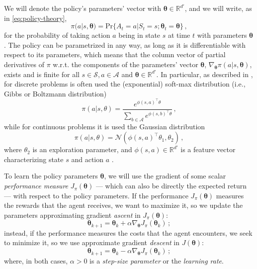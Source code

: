 We will denote the policy's parameters' vector with $\boldsymbol \theta \in \mathbb R^{d'}$, and we will write, as in \eqref{eq:policy-theory},
\begin{equation}
    \pi(a|s,\boldsymbol \theta) = \text{Pr}\{A_t = a | S_t = s; \boldsymbol \theta_t = \boldsymbol {\theta}\} \, ,
    \label{eq:policy-with-parameters}
\end{equation}
for the probability of taking action $a$ being in state $s$ at time $t$ with parameters $\boldsymbol \theta$ \cite{SuttonBarto}. The policy can be parametrized in any way, as long as it is differentiable with respect to its parameters, which means that the column vector of partial derivatives of $\pi$ w.r.t. the components of the parameters' vector $\boldsymbol \theta$, $\nabla_{\boldsymbol \theta} \pi (a|s,\boldsymbol \theta)$, exists and is finite for all $s \in \mathcal S, a \in \mathcal A$ and $\boldsymbol \theta \in \mathbb R^{d'}$. In particular, as described in \cite{Peters2010}, for discrete problems is often used the (exponential) soft-max distribution (i.e., Gibbs or Boltzmann distribution)
\begin{equation}
    \pi(a|s, \theta) = \frac{e^{\phi(s,a)^\top \theta}}{\sum_{b \in \mathcal A} e^{\phi(s,b)^\top \theta}} \, ,
    \label{eq:pi-boltzmann}
\end{equation}
while for continuous problems it is used the Gaussian distribution
\begin{equation}
    \pi(a|s, \theta) = \mathcal N(\phi(s,a)^\top \theta_1, \theta_2) \, ,
\end{equation}
where $\theta_2$ is an exploration parameter, and $\phi(s,a) \in \mathbb R^{d'}$ is a feature vector characterizing state $s$ and action $a$ \cite{Sutton2000}.

To learn the policy parameters $\boldsymbol \theta$, we will use the  gradient of some scalar \emph{performance measure} $J_\pi(\boldsymbol \theta)$ --- which can also be directly the expected return --- with respect to the policy parameters. If the performance $J_\pi(\boldsymbol \theta)$ measures the rewards that the agent receives, we want to maximize it, so we update the parameters approximating gradient \textit{ascent} in $J_\pi(\boldsymbol \theta)$:
\begin{equation}
    \boldsymbol \theta_{k+1} = \boldsymbol \theta_k + \alpha \nabla_{\boldsymbol \theta} J_\pi(\boldsymbol \theta_k) \, ;
    \label{eq:grad-ascent}
\end{equation}
instead, if the performance measures the costs that the agent encounters, we seek to minimize it, so we use approximate gradient \textit{descent} in $J(\boldsymbol \theta)$:
\begin{equation}
    \boldsymbol \theta_{k+1} = \boldsymbol \theta_k - \alpha \nabla_{\boldsymbol \theta} J_\pi(\boldsymbol \theta_k) \, ;
    \label{eq:grad-descent}
\end{equation}
where, in both cases, $\alpha > 0$ is a \emph{step-size parameter} or the \emph{learning rate}.

